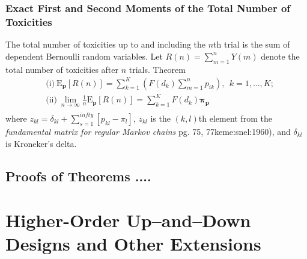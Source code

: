 \subsection{Exact First and Second Moments of the Total Number of Toxicities}
The total number of toxicities up to and including the $n$th trial is the sum of dependent Bernoulli random variables.  Let $R(n)=\sum_{m=1}^nY(m)$ denote the total number of toxicities after $n$ trials.
Theorem
\begin{align*}
&\textrm{(i)}\  \mathrm{E}_{\mathbf{p}}[R(n)]=\sum_{k=1}^K \left(F(d_k) \sum_{m=1}^n p_{ik}\right), \ \ k=1,\ldots,K;\\
&\textrm{(ii)}\  \lim_{n\rightarrow\infty} \frac{1}{n} \mathrm{E}_{\mathbf{p}}[R(n)]=   \sum_{k=1}^K F(d_k) \boldsymbol{\pi}_{\mathbf{p}} \\
\end{align*}
where $z_{kl}=\delta_{kl}+\sum_{s=1}^{infty}\left[p_{kl}-\pi_l\right]$, $z_{kl}$ is the $(k,l)$th element from the \textit{fundamental matrix for regular Markov chains}  \citep{see, for example}{pg. 75, 77}{keme:snel:1960}), and $\delta_{kl}$ is Kroneker's delta.

\section{Proofs of Theorems ....}


\chapter{Higher-Order Up--and--Down Designs and Other Extensions}\label{sec:extens}

